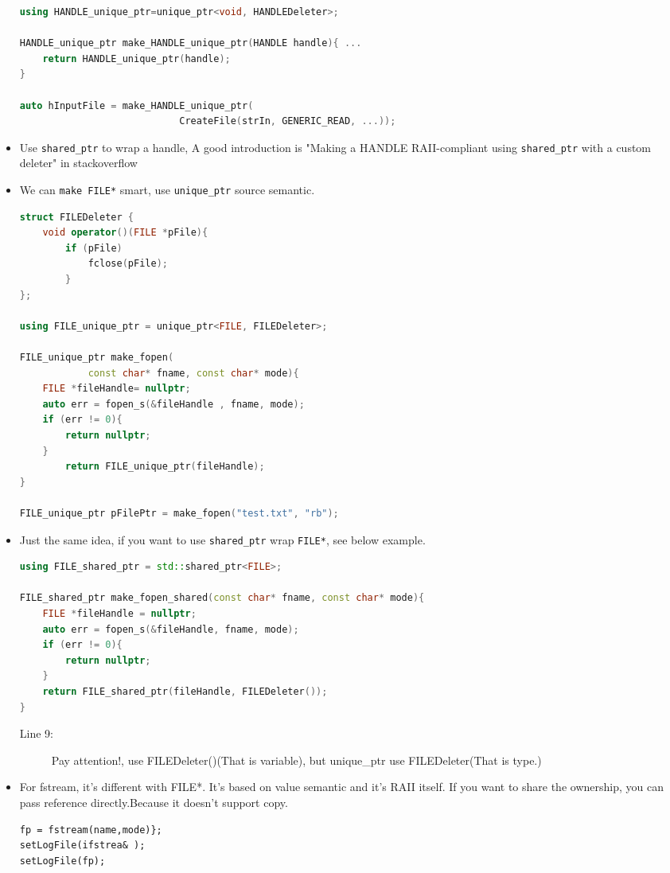 \documentclass[a4paper,11pt,twoside]{book}
\begin{document}
\begin{itemize}
\begin{lstlisting}[frame=single, language=c++]
using HANDLE_unique_ptr=unique_ptr<void, HANDLEDeleter>;
	
HANDLE_unique_ptr make_HANDLE_unique_ptr(HANDLE handle){ ...
	return HANDLE_unique_ptr(handle);
}
	
auto hInputFile = make_HANDLE_unique_ptr(
                            CreateFile(strIn, GENERIC_READ, ...));
\end{lstlisting}
	
	\item Use \texttt{shared\_ptr} to wrap a handle, A good introduction is "Making a HANDLE RAII-compliant using \texttt{shared\_ptr} with a custom deleter" in stackoverflow

	\item We can \texttt{make FILE*} smart, use \texttt{unique\_ptr} source semantic.
\begin{lstlisting}[frame=single, language=c++]
struct FILEDeleter {
	void operator()(FILE *pFile){
		if (pFile)
			fclose(pFile);
		}
};
	
using FILE_unique_ptr = unique_ptr<FILE, FILEDeleter>;
	
FILE_unique_ptr make_fopen(
			const char* fname, const char* mode){
	FILE *fileHandle= nullptr;
	auto err = fopen_s(&fileHandle , fname, mode); 
	if (err != 0){
		return nullptr;
	} 
		return FILE_unique_ptr(fileHandle);
}
	
FILE_unique_ptr pFilePtr = make_fopen("test.txt", "rb");
\end{lstlisting}
	
\item Just the same idea, if you want to use \texttt{shared\_ptr} wrap \texttt{FILE*}, see below example.
\begin{lstlisting}[frame=single, language=c++]
using FILE_shared_ptr = std::shared_ptr<FILE>;
	
FILE_shared_ptr make_fopen_shared(const char* fname, const char* mode){
	FILE *fileHandle = nullptr;
	auto err = fopen_s(&fileHandle, fname, mode);
	if (err != 0){
		return nullptr;
	}
	return FILE_shared_ptr(fileHandle, FILEDeleter());
}
\end{lstlisting}
\begin{description}
	\item[Line 9:] Pay attention!, use FILEDeleter()(That is variable), but unique\_ptr use FILEDeleter(That is type.)
\end{description}

	\item For fstream, it's different with FILE*. It's based on value semantic and it's RAII itself. If you want to share the ownership, you can pass reference directly.Because it doesn't support copy.

\begin{lstlisting}[numbers=none]
fp = fstream(name,mode)};
setLogFile(ifstrea& );
setLogFile(fp);
\end{lstlisting}

\end{itemize}
\end{document}
